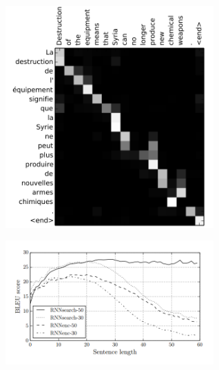 \documentclass{beamer}
\begin{document}
\begin{frame}
  \begin{center}
    \includegraphics[width=0.6\textwidth]{attenalign}
  \end{center}
\end{frame}

\begin{frame}
  \begin{center}
    \includegraphics[width=0.6\textwidth]{attengraph}
  \end{center}
\end{frame}




    


\end{document}
